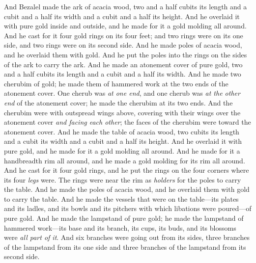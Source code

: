 \begin{biblechapter} %
 And Bezalel made the ark of acacia wood, two and a half cubits its length and a cubit and a half its width and a cubit and a half its height.
\verse And he overlaid it with pure gold inside and outside, and he made for it a gold molding all around.
\verse And he cast for it four gold rings on its four feet; and two rings were on its one side, and two rings were on its second side.
\verse And he made poles of acacia wood, and he overlaid them with gold.
\verse And he put the poles into the rings on the sides of the ark to carry the ark.
\verse And he made an atonement cover of pure gold, two and a half cubits its length and a cubit and a half its width.
\verse And he made two cherubim of gold; he made them of hammered work at the two ends of the atonement cover.
\verse One cherub was \textit{at one end}, and one cherub was \textit{at the other end} of the atonement cover; he made the cherubim at its two ends.
\verse And the cherubim were with outspread wings above, covering with their wings over the atonement cover \textit{and facing each other}; the faces of the cherubim were toward the atonement cover.
 And he made the table of acacia wood, two cubits its length and a cubit its width and a cubit and a half its height.
\verse And he overlaid it with pure gold, and he made for it a gold molding all around.
\verse And he made for it a handbreadth rim all around, and he made a gold molding for its rim all around.
\verse And he cast for it four gold rings, and he put the rings on the four corners where its four \textit{legs} were.
\verse The rings were near the rim as \textit{holders} for the poles to carry the table.
\verse And he made the poles of acacia wood, and he overlaid them with gold to carry the table.
\verse And he made the vessels that were on the table—its plates and its ladles, and its bowls and its pitchers with which libations were poured—of pure gold.
\verse And he made the lampstand of pure gold; he made the lampstand of hammered work—its base and its branch, its cups, its buds, and its blossoms were \textit{all part of it}.
\verse And six branches were going out from its sides, three branches of the lampstand from its one side and three branches of the lampstand from its second side.

\end{biblechapter}

